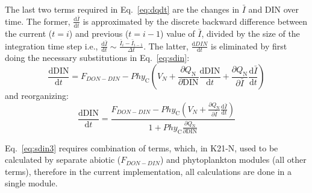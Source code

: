 \documentclass[gmd, manuscript]{copernicus}
\begin{document}
The last two terms required in Eq.~\ref{eq:dqdt} are the changes in $\bar{I}$ and DIN over time. The former, $\frac{\text{d} \bar{I}}{\text{d} t}$ is approximated by the discrete backward difference between the current ($t=i$) and previous ($t=i-1$) value of $\bar{I}$, divided by the size of the integration time step i.e., $\frac{\text{d} \bar{I}}{\text{d} t} \sim \frac{\bar{I}_{i} - \bar{I}_{i-1}}{\Delta t}$.  The latter, $\frac{\text{d} DIN}{\text{d} t}$ is eliminated by first doing the necessary substitutions in Eq.~\ref{eq:sdin}:
\begin{equation}\label{eq:sdin2}
 \frac{\text{d}\text{DIN}}{\text{d}t} = F_{DON-DIN} - Phy_{\text{C}} \left(V_N + \frac{\partial Q_\text{N}}{\partial \text{DIN}} \frac{\text{d} \text{DIN}}{\text{d} t} +  \frac{\partial Q_\text{N}}{\partial \bar{I}} \frac{\text{d} \bar{I}}{\text{d} t} \right)
\end{equation}
and reorganizing:
\begin{equation}\label{eq:sdin3}
 \frac{\text{d}\text{DIN}}{\text{d}t} = \frac{F_{DON-DIN} - Phy_{\text{C}} \left(V_N +  \frac{\partial Q_\text{N}}{\partial \bar{I}} \frac{\text{d} \bar{I}}{\text{d} t} \right)}{ 1+Phy_{\text{C}}\frac{\partial Q_\text{N}}{\partial \text{DIN}}}
\end{equation}

Eq.~\ref{eq:sdin3} requires combination of terms, which, in K21-N, used to be calculated by separate abiotic ($F_{DON-DIN}$) and phytoplankton modules (all other terms), therefore in the current implementation, all calculations are done in a single module.





\end{document}

